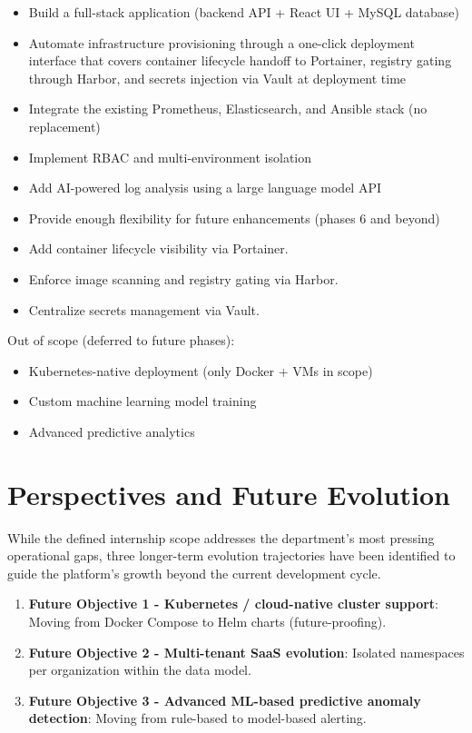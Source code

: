 \documentclass[12pt,a4paper]{report}
\begin{document}
\begin{itemize}
  \item Build a full-stack application (backend API + React UI + MySQL database)
  \item Automate infrastructure provisioning through a one-click deployment interface that covers container lifecycle handoff to Portainer, registry gating through Harbor, and secrets injection via Vault at deployment time
  \item Integrate the existing Prometheus, Elasticsearch, and Ansible stack (no replacement)
  \item Implement RBAC and multi-environment isolation
  \item Add AI-powered log analysis using a large language model API
  \item Provide enough flexibility for future enhancements (phases 6 and beyond)
  \item Add container lifecycle visibility via Portainer.
  \item Enforce image scanning and registry gating via Harbor.
  \item Centralize secrets management via Vault.
\end{itemize}

Out of scope (deferred to future phases):
\begin{itemize}
  \item Kubernetes-native deployment (only Docker + VMs in scope)
  \item Custom machine learning model training
  \item Advanced predictive analytics
\end{itemize}

\section{Perspectives and Future Evolution}

While the defined internship scope addresses the department's most pressing operational gaps, three longer-term evolution trajectories have been identified to guide the platform's growth beyond the current development cycle.
\begin{enumerate}
    \item \textbf{Future Objective 1 - Kubernetes / cloud-native cluster support}: Moving from Docker Compose to Helm charts (future-proofing).
    \item \textbf{Future Objective 2 - Multi-tenant SaaS evolution}: Isolated namespaces per organization within the data model.
    \item \textbf{Future Objective 3 - Advanced ML-based predictive anomaly detection}: Moving from rule-based to model-based alerting.
\end{enumerate}
\end{document}
